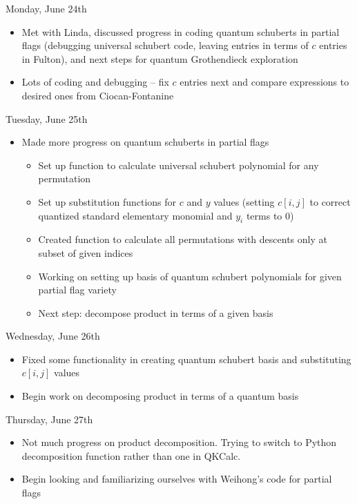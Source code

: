 Monday, June 24th
\begin{itemize}
    \item Met with Linda, discussed progress in coding quantum schuberts in partial flags (debugging universal schubert code, leaving entries in terms of $c$ entries in Fulton), and next steps for quantum Grothendieck exploration
    \item Lots of coding and debugging -- fix $c$ entries next and compare expressions to desired ones from Ciocan-Fontanine
\end{itemize}

Tuesday, June 25th
\begin{itemize}
    \item Made more progress on quantum schuberts in partial flags
    \begin{itemize}
        \item Set up function to calculate universal schubert polynomial for any permutation
        \item Set up substitution functions for $c$ and $y$ values (setting $c[i, j]$ to correct quantized standard elementary monomial and $y_i$ terms to $0$)
        \item Created function to calculate all permutations with descents only at subset of given indices
        \item Working on setting up basis of quantum schubert polynomials for given partial flag variety
        \item Next step: decompose product in terms of a given basis
    \end{itemize}
\end{itemize}

Wednesday, June 26th
\begin{itemize}
    \item Fixed some functionality in creating quantum schubert basis and substituting $c[i, j]$ values
    \item Begin work on decomposing product in terms of a quantum basis
\end{itemize}

Thursday, June 27th
\begin{itemize}
    \item Not much progress on product decomposition. Trying to switch to Python decomposition function rather than one in QKCalc.
    \item Begin looking and familiarizing ourselves with Weihong's code for partial flags
\end{itemize}


